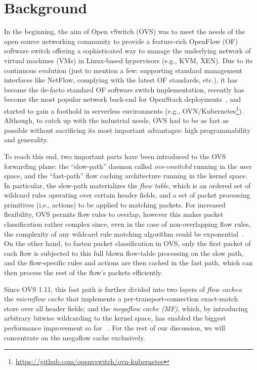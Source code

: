 \documentclass[a4paper,10pt]{article}
\begin{document}
\section{Background}
In the beginning, the aim of Open vSwitch (OVS) was to meet the needs of the open source networking community to provide a feature-rich OpenFlow  (OF) software switch offering a sophisticated way to manage the underlying network of virtual machines (VMs) in Linux-based hypervisors (e.g., KVM, XEN). 
Due to its continuous evolution (just to mention a few: supporting standard management interfaces like NetFlow, complying with the latest OF standards, etc.), it has become the de-facto standard OF software switch implementation, recently has become the most popular network back-end for OpenStack deployments~\cite{ovs_acceleration}, and started to gain a foothold in serverless environments (e.g., OVN/Kubernetes\footnote{\url{https://github.com/openvswitch/ovn-kubernetes}}).
Although, to catch up with the industrial needs, OVS had to be as fast as possible without sacrificing its most important advantages: high programmability and generality.

To reach this end, two important parts have been introduced to the OVS forwarding plane: the ``slow-path'' daemon called \textit{ovs-vswitchd} running in the user space, and the ``fast-path'' flow caching architecture running in the kernel space.
In particular, the slow-path materializes the \textit{flow table}, which is an ordered set of wildcard rules operating over certain header fields, and a set of packet processing primitives (i.e., actions) to be applied to matching packets.
For increased flexibility, OVS permits flow rules to overlap, however this makes packet classification rather complex since, even in the case of non-overlapping flow rules, the complexity of any wildcard rule matching algorithm could be exponential~\cite{Gupta:2001:APC:2329014.2329458}.
On the other hand, to fasten packet classification in OVS, only the first packet of each flow is subjected to this full blown flow-table processing on the slow path, and the flow-specific rules and actions are then cached in the fast path, which can then process the rest of the flow's packets efficiently.

Since OVS 1.11, this fast path is further divided into two layers of \emph{flow caches}: the \emph{microflow cache} that implements a per-transport-connection exact-match store over all header fields; and the \emph{megaflow cache (MF)}, which, by introducing arbitrary bitwise wildcarding to the kernel space, has enabled the biggest performance improvement so far 
~\cite{ovs_acceleration}.
For the rest of our discussion, we will concentrate on the megaflow cache exclusively.
\end{document}
